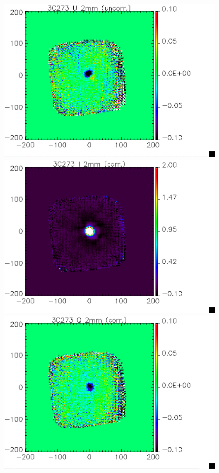 \documentclass[a4paper,10pt]{article}
\begin{document}
\begin{figure}
\begin{center}
\includegraphics[clip, angle=0, scale = 0.3]{figures/U_3C273_2mm_uncorr.eps}
\includegraphics[clip, angle=0, scale = 0.3]{figures/I_3C273_2mm_corr.eps}
\includegraphics[clip, angle=0, scale = 0.3]{figures/Q_3C273_2mm_corr.eps}

\end{center}
\end{figure}
\end{document}
